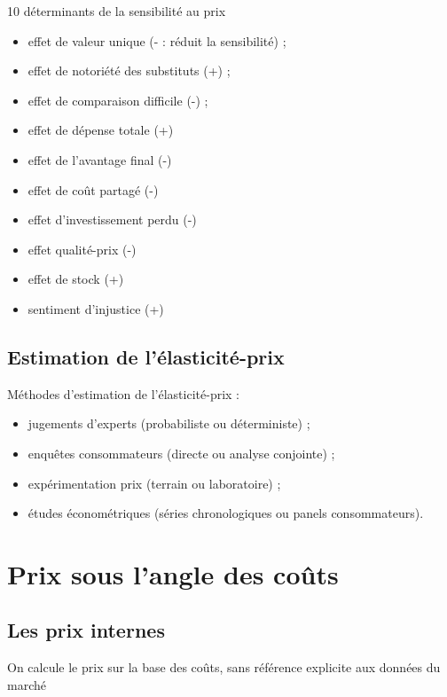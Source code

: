 		
		10 déterminants de la sensibilité au prix
		
		\begin{itemize}
			\item effet de valeur unique (- : réduit la sensibilité) ;
			\item effet de notoriété des substituts (+) ;
			\item effet de comparaison difficile (-) ;
			\item effet de dépense totale (+)
			\item effet de l'avantage final (-)
			\item effet de coût partagé (-)
			\item effet d'investissement perdu (-)
			\item effet qualité-prix (-)
			\item effet de stock (+)
			\item sentiment d'injustice (+)
		\end{itemize}
		
		\subsection{Estimation de l'élasticité-prix}
		
		Méthodes d'estimation de l'élasticité-prix : 
		
		\begin{itemize}
			\item jugements d'experts (probabiliste ou déterministe) ;
			\item enquêtes consommateurs (directe ou analyse conjointe) ;
			\item expérimentation prix (terrain ou laboratoire) ;
			\item études économétriques (séries chronologiques ou panels consommateurs).
		\end{itemize}
		
		
	\section{Prix sous l'angle des coûts}
	
	
	
		\subsection{Les prix internes}
		
		On calcule le prix sur la base des coûts, sans référence explicite aux données du marché
	
